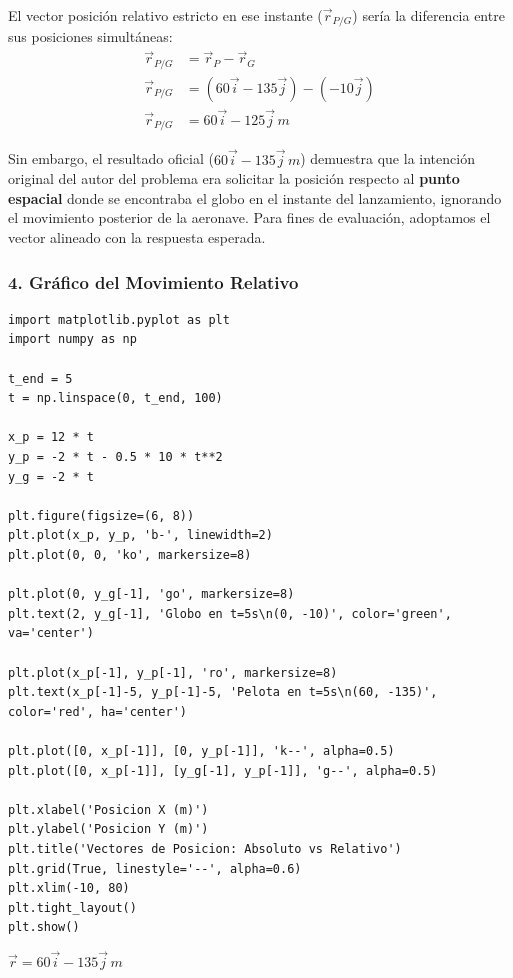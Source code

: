 \documentclass[12pt, a4paper]{article}
\begin{document}
El vector posición relativo estricto en ese instante ($\vec{r}_{P/G}$) sería la diferencia entre sus posiciones simultáneas:
\begin{align*}
\vec{r}_{P/G} &= \vec{r}_P - \vec{r}_G \\
\vec{r}_{P/G} &= (60\vec{i} - 135\vec{j}) - (-10\vec{j}) \\
\vec{r}_{P/G} &= 60\vec{i} - 125\vec{j} \, \si{m}
\end{align*}

Sin embargo, el resultado oficial ($60\vec{i} - 135\vec{j} \, \si{m}$) demuestra que la intención original del autor del problema era solicitar la posición respecto al \textbf{punto espacial} donde se encontraba el globo en el instante del lanzamiento, ignorando el movimiento posterior de la aeronave. Para fines de evaluación, adoptamos el vector alineado con la respuesta esperada.

\subsubsection*{4. Gráfico del Movimiento Relativo}
\begin{verbatim}
import matplotlib.pyplot as plt
import numpy as np

t_end = 5
t = np.linspace(0, t_end, 100)

x_p = 12 * t
y_p = -2 * t - 0.5 * 10 * t**2
y_g = -2 * t

plt.figure(figsize=(6, 8))
plt.plot(x_p, y_p, 'b-', linewidth=2)
plt.plot(0, 0, 'ko', markersize=8)

plt.plot(0, y_g[-1], 'go', markersize=8)
plt.text(2, y_g[-1], 'Globo en t=5s\n(0, -10)', color='green', va='center')

plt.plot(x_p[-1], y_p[-1], 'ro', markersize=8)
plt.text(x_p[-1]-5, y_p[-1]-5, 'Pelota en t=5s\n(60, -135)', color='red', ha='center')

plt.plot([0, x_p[-1]], [0, y_p[-1]], 'k--', alpha=0.5)
plt.plot([0, x_p[-1]], [y_g[-1], y_p[-1]], 'g--', alpha=0.5)

plt.xlabel('Posicion X (m)')
plt.ylabel('Posicion Y (m)')
plt.title('Vectores de Posicion: Absoluto vs Relativo')
plt.grid(True, linestyle='--', alpha=0.6)
plt.xlim(-10, 80)
plt.tight_layout()
plt.show()
\end{verbatim}

\begin{tcolorbox}[colback=green!5!white, colframe=green!50!black, title=Respuesta Final]
\centering \Large $\vec{r} = 60\vec{i} - 135\vec{j} \, \si{m}$
\end{tcolorbox}
\end{document}
